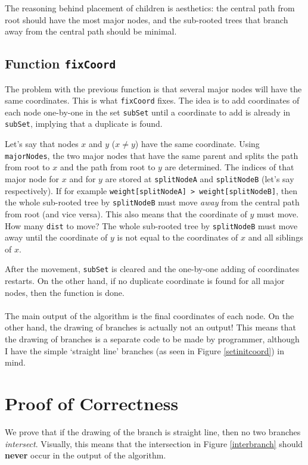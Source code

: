 \documentclass{article}
\theoremstyle{plain}
\theoremstyle{remark}
\begin{document}
The reasoning behind placement of children is aesthetics: the central path from root should have the most major nodes, and the sub-rooted trees that branch away from the central path should be minimal.

\subsection{Function \texttt{fixCoord}}
The problem with the previous function is that several major nodes will have the same coordinates. This is what \texttt{fixCoord} fixes. The idea is to add coordinates of each node one-by-one in the set \texttt{subSet} until a coordinate to add is already in \texttt{subSet}, implying that a duplicate is found.

Let's say that nodes $x$ and $y$ ($x \ne y$) have the same coordinate. Using \texttt{majorNodes}, the two major nodes that have the same parent and splits the path from root to $x$ and the path from root to $y$ are determined. The indices of that major node for $x$ and for $y$ are stored at \texttt{splitNodeA} and \texttt{splitNodeB} (let's say respectively). If for example \texttt{weight[splitNodeA] > weight[splitNodeB]}, then the whole sub-rooted tree by \texttt{splitNodeB} must move \textit{away} from the central path from root (and vice versa). This also means that the coordinate of $y$ must move. How many \texttt{dist} to move? The whole sub-rooted tree by \texttt{splitNodeB} must move away until the coordinate of $y$ is not equal to the coordinates of $x$ and all siblings of $x$.

After the movement, \texttt{subSet} is cleared and the one-by-one adding of coordinates restarts. On the other hand, if no duplicate coordinate is found for all major nodes, then the function is done.
\\
\\
The main output of the algorithm is the final coordinates of each node. On the other hand, the drawing of branches is actually not an output! This means that the drawing of branches is a separate code to be made by programmer, although I have the simple `straight line' branches (as seen in Figure \ref{setinitcoord}) in mind.

\section{Proof of Correctness}
We prove that if the drawing of the branch is straight line, then no two branches \textit{intersect}. Visually, this means that the intersection in Figure \ref{interbranch} should \textbf{never} occur in the output of the algorithm.
\end{document}
